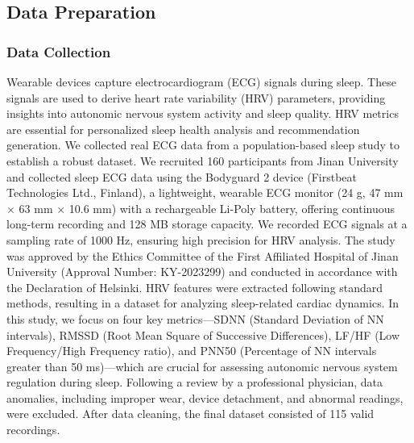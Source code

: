 \documentclass[preprint,12pt]{elsarticle}
\begin{document}
\subsection{Data Preparation}
\subsubsection{Data Collection}
Wearable devices capture electrocardiogram (ECG) signals during sleep. These signals are used to derive heart rate variability (HRV) parameters, providing insights into autonomic nervous system activity and sleep quality. HRV metrics are essential for personalized sleep health analysis and recommendation generation. We collected real ECG data from a population-based sleep study to establish a robust dataset. We recruited 160 participants from Jinan University and collected sleep ECG data using the Bodyguard 2 device (Firstbeat Technologies Ltd., Finland), a lightweight, wearable ECG monitor (24 g, 47 mm × 63 mm × 10.6 mm) with a rechargeable Li-Poly battery, offering continuous long-term recording and 128 MB storage capacity. We recorded ECG signals at a sampling rate of 1000 Hz, ensuring high precision for HRV analysis. The study was approved by the Ethics Committee of the First Affiliated Hospital of Jinan University (Approval Number: KY-2023299) and conducted in accordance with the Declaration of Helsinki.
HRV features were extracted following standard methods, resulting in a dataset for analyzing sleep-related cardiac dynamics. In this study, we focus on four key metrics—SDNN (Standard Deviation of NN intervals), RMSSD (Root Mean Square of Successive Differences), LF/HF (Low Frequency/High Frequency ratio), and PNN50 (Percentage of NN intervals greater than 50 ms)—which are crucial for assessing autonomic nervous system regulation during sleep. Following a review by a professional physician, data anomalies, including improper wear, device detachment, and abnormal readings, were excluded. After data cleaning, the final dataset consisted of 115 valid recordings. 
\end{document}
